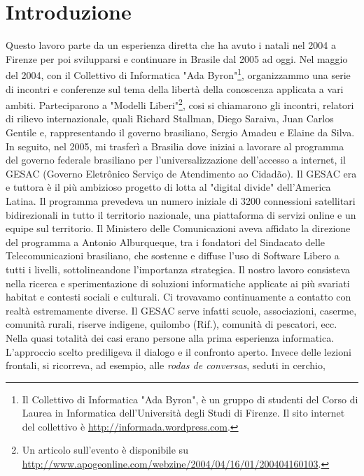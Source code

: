 
\chapter{Introduzione}
\label{Capitolo1}

Questo lavoro parte da un esperienza diretta che ha avuto i natali nel
2004 a Firenze per poi svilupparsi e continuare in Brasile dal 2005 ad
oggi. Nel maggio del 2004, con il Collettivo di Informatica "Ada
Byron"\footnote{Il Collettivo di Informatica "Ada Byron", è un gruppo
  di studenti del Corso di Laurea in Informatica dell’Università degli
  Studi di Firenze. Il sito internet del collettivo è
  \url{http://informada.wordpress.com}.}, organizzammo una serie di
incontri e conferenze sul tema della libertà della conoscenza
applicata a vari ambiti. Parteciparono a "Modelli Liberi"\footnote{Un
  articolo sull'evento è disponibile su
  \url{http://www.apogeonline.com/webzine/2004/04/16/01/200404160103}.},
cosi si chiamarono gli incontri, relatori di rilievo internazionale,
quali Richard Stallman, Diego Saraiva, Juan Carlos Gentile e,
rappresentando il governo brasiliano, Sergio Amadeu e Elaine da
Silva. In seguito, nel 2005, mi trasferì a Brasilia dove iniziai a
lavorare al programma del governo federale brasiliano per
l'universalizzazione dell'accesso a internet, il GESAC (Governo
Eletrônico Serviço de Atendimento ao Cidadão). Il GESAC era e tuttora
è il più ambizioso progetto di lotta al "digital divide" dell'America
Latina. Il programma prevedeva un numero iniziale di 3200 connessioni
satellitari bidirezionali in tutto il territorio nazionale, una
piattaforma di servizi online e un equipe sul territorio. Il Ministero
delle Comunicazioni aveva affidato la direzione del programma a
Antonio Alburqueque, tra i fondatori del Sindacato delle
Telecomunicazioni brasiliano, che sostenne e diffuse l'uso di Software
Libero a tutti i livelli, sottolineandone l'importanza strategica. Il
nostro lavoro consisteva nella ricerca e sperimentazione di soluzioni
informatiche applicate ai più svariati habitat e contesti sociali e
culturali. Ci trovavamo continuamente a contatto con realtà
estremamente diverse. Il GESAC serve infatti scuole, associazioni,
caserme, comunità rurali, riserve indigene, quilombo (Rif.), comunità
di pescatori, ecc. Nella quasi totalità dei casi erano persone alla
prima esperienza informatica. L'approccio scelto prediligeva il
dialogo e il confronto aperto. Invece delle lezioni frontali, si
ricorreva, ad esempio, alle \emph{rodas de conversas}, seduti in cerchio,
